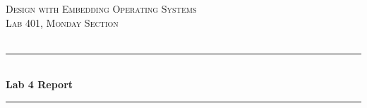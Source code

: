 \documentclass[a4paper,10pt]{article}
\begin{document}

\begin{titlepage}

\newcommand{\HRule}{\rule{\linewidth}{0.45mm}} %

\center %
 
\textsc{\LARGE Design with Embedding Operating Systems}\\[1.5cm] %
\textsc{\Large Lab 401, Monday Section}\\[0.5cm] %
\textsc{\large }\\[0.5cm] %

\HRule \\[0.4cm]
{ \huge \bfseries Lab 4 Report}\\ %
\HRule \\[0.5cm]

 \\
 \\[6cm]

\\




\vfill %

\end{titlepage}
\end{document}
